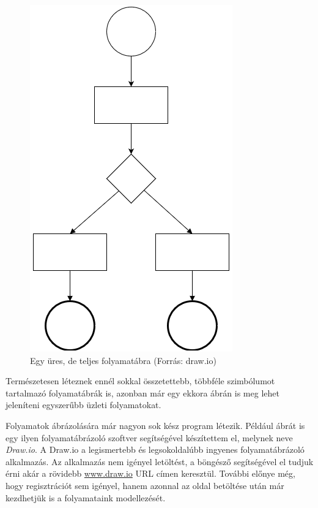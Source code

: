 \begin{figure}[h]
\centering
\includegraphics[scale=0.8]{images/uresfolyamat.png}
\caption{Egy üres, de teljes folyamatábra (Forrás: draw.io)}
\label{fig:uresfolyamat}
\end{figure}

Természetesen léteznek ennél sokkal összetettebb, többféle szimbólumot tartalmazó folyamatábrák is, azonban már egy ekkora ábrán is meg lehet jeleníteni egyszerűbb üzleti folyamatokat.



Folyamatok ábrázolására már nagyon sok kész program létezik. Például  ábrát is egy ilyen folyamatábrázoló szoftver segítségével készítettem el, melynek neve \textit{Draw.io}\cite{drawio}. A Draw.io a legismertebb és legsokoldalúbb ingyenes folyamatábrázoló alkalmazás. Az alkalmazás nem igényel letöltést, a böngésző segítségével el tudjuk érni akár a rövidebb \url{www.draw.io} URL címen keresztül. További előnye még, hogy regisztrációt sem igényel, hanem azonnal az oldal betöltése után már kezdhetjük is a folyamataink modellezését.

